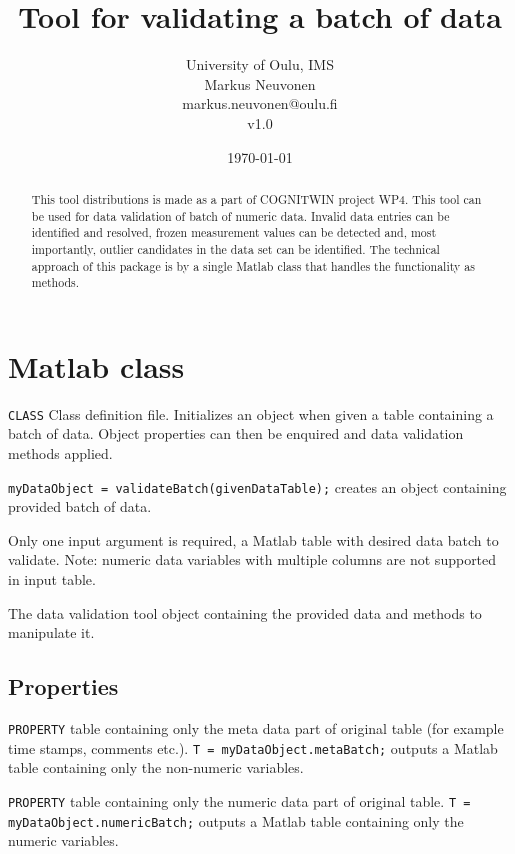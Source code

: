\documentclass[twoside,a4paper]{refart}
\title{Tool for validating a batch of data}
\author{University of Oulu, IMS \\
Markus Neuvonen \\
markus.neuvonen@oulu.fi \\
v1.0\\
\date{\today}}
\begin{document}
\maketitle
\begin{abstract}
        This tool distributions is made as a part of COGNITWIN project WP4. This tool can be used for data validation of batch of numeric data. Invalid data entries can be identified and resolved, frozen measurement values can be detected and, most importantly, outlier candidates in the data set can be identified. The technical approach of this package is by a single Matlab class that handles the functionality as methods.
\end{abstract}



\section{Matlab class}
\verb|CLASS| Class definition file. Initializes an object when given a table containing a batch of data. Object properties can then be enquired and data validation methods applied.

\verb|myDataObject = validateBatch(givenDataTable);| creates an object containing provided batch of data.

 Only one input argument is required, a Matlab table with desired data batch to validate. Note: numeric data variables with multiple columns are not supported in input table.

 The data validation tool object containing the provided data and methods to manipulate it.

\subsection{Properties}
\verb|PROPERTY| table containing only the meta data part of original table (for example time stamps, comments etc.).
\verb|T = myDataObject.metaBatch;| outputs a Matlab table containing only the non-numeric variables.

\verb|PROPERTY| table containing only the numeric data part of original table.
\verb|T = myDataObject.numericBatch;| outputs a Matlab table containing only the numeric variables.
\end{document}
